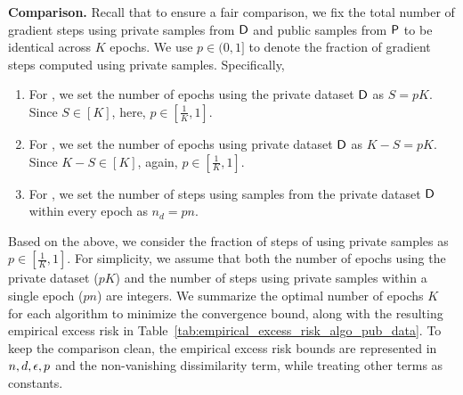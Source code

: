 \textbf{Comparison.} Recall that to ensure a fair comparison, we fix the total number of gradient steps using private samples from ${\mathsf{D}}$ and public samples from ${\mathsf{P}}$ to be identical across $K$ epochs. We use $p\in (0,1]$ to denote the fraction of gradient steps computed using private samples. Specifically,
\begin{enumerate}[itemsep=0mm]
    \item For \pubpriv, we set the number of epochs using the private dataset ${\mathsf{D}}$ as $S = p K$. Since $S \in [K]$, here, $p \in [\frac{1}{K}, 1]$.
    \item For \privpub, we set the number of epochs using private dataset ${\mathsf{D}}$ as $K - S = p K$. Since $K - S \in [K]$, again, $p\in [\frac{1}{K}, 1]$.
    \item For \interleaved, we set the number of steps using samples from the private dataset ${\mathsf{D}}$ within every epoch as $n_d = p n$.
\end{enumerate}

Based on the above, we consider the fraction of steps of using private samples as $p\in [\frac{1}{K}, 1]$.
For simplicity, we assume that both the number of epochs using the private dataset ($pK$) and the number of steps using private samples within a single epoch ($pn$) are integers.
We summarize the optimal number of epochs $K$ for each algorithm to minimize the convergence bound, along with the resulting empirical excess risk in Table~\ref{tab:empirical_excess_risk_algo_pub_data}. 
To keep the comparison clean, the empirical excess risk bounds are represented in $n,d,{\epsilon}, p$ and the non-vanishing dissimilarity term,
while treating other terms as constants.



